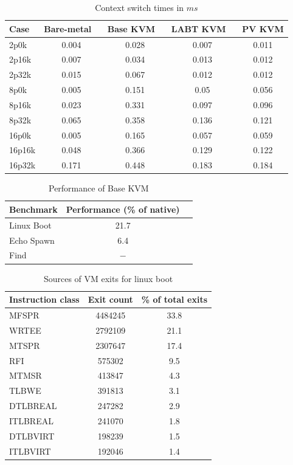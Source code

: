 \documentclass[10pt,twocolumn]{article}
\begin{document}
\begin{table}
\centering
\caption{Context switch times in $ms$}
      \begin{tabular}{|l | c| c |c |c|} \hline
       Case\verb, ,  & Bare-metal \verb, ,& Base KVM \verb, , & LABT KVM \verb, ,& PV KVM \\ \hline

2p0k	&	0.004	&	0.028	&	0.007	&	0.011	\\ \hline
2p16k	&	0.007	&	0.034	&	0.013	&	0.012	\\ \hline
2p32k	&	0.015	&	0.067	&	0.012	&	0.012	\\ \hline
8p0k	&	0.005	&	0.151	&	0.05	&	0.056	\\ \hline
8p16k	&	0.023	&	0.331	&	0.097	&	0.096	\\ \hline
8p32k	&	0.065	&	0.358	&	0.136	&	0.121	\\ \hline
16p0k	&	0.005	&	0.165	&	0.057	&	0.059	\\ \hline
16p16k	&	0.048	&	0.366	&	0.129	&	0.122	\\ \hline
16p32k	&	0.171	&	0.448	&	0.183	&	0.184	\\ \hline

        \hline
      \end{tabular}
\label{tab:lpGMKLsmall}
\end{table} 


\begin{table}[!b]
\centering
\caption{Performance of Base KVM}
     \begin{tabular}{lcc} \hline
       Benchmark  & Performance (\% of native) \\ \hline
       Linux Boot & 21.7 \\
       Echo Spawn & 6.4 \\
       Find & ${-}$ \\
       \hline
     \end{tabular}
\label{tab:PerfBase}
\end{table}


\begin{table}[!b]
\centering
\caption{Sources of VM exits for linux boot}
     \begin{tabular}{lcc} \hline
       Instruction class  & Exit count & \% of total exits  \\ \hline
       MFSPR & 4484245 & 33.8  \\
       WRTEE & 2792109 & 21.1  \\
       MTSPR & 2307647 & 17.4  \\
       RFI & 575302 & 9.5 \\
       MTMSR & 413847 & 4.3 \\
       TLBWE & 391813 & 3.1 \\
       DTLBREAL & 247282 & 2.9 \\
       ITLBREAL & 241070 & 1.8 \\
       DTLBVIRT & 198239 & 1.5 \\
       ITLBVIRT & 192046 & 1.4 \\
       \hline
     \end{tabular}
\label{tab:NumExitsBase}
\end{table}
\end{document}
